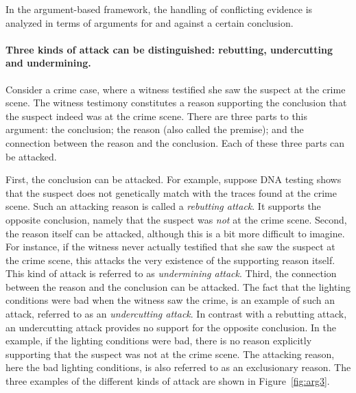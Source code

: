 \documentclass[10pt]{article}
\begin{document}
In the argument-based framework, the handling of conflicting evidence is analyzed 
in terms of arguments for and against a certain conclusion.


\paragraph{Three kinds of attack can be distinguished: rebutting, undercutting and undermining.}

Consider a crime case, where a witness testified she saw the suspect at the crime scene. The witness testimony constitutes a 
reason supporting the conclusion that the suspect indeed was at the crime scene. There are three parts to this argument: the conclusion; the reason (also called the premise); and the connection between the reason and the conclusion.
Each of these three parts can be attacked. %

First, the conclusion can be attacked. %
For example, suppose DNA testing shows that the suspect does not genetically match 
with the traces found at the crime scene. 
Such an attacking reason is called a \textit{rebutting attack}.  
It supports the opposite conclusion, namely that the suspect was \textit{not} 
at the crime scene. 
%
Second, the reason itself can be attacked, although this is a bit more difficult to imagine.  
 For instance, %
 if the witness never actually testified that she saw the suspect at the crime scene, this attacks the very 
 existence of the supporting reason itself. 
 This kind of attack is referred to as \textit{undermining attack}. 
%
Third, the connection between the reason and the conclusion can be attacked.
 The fact that the lighting conditions were bad when the witness saw the crime, 
 is an example of such an attack, referred to as an \textit{undercutting attack}.
 In contrast with a rebutting attack, an undercutting attack provides no support for the opposite conclusion. In the example, %
 if the lighting conditions were bad, there is no reason explicitly 
 supporting that the suspect was not at the crime scene. The attacking reason, %
 here the bad lighting conditions, is also referred to as an exclusionary reason. 
%
The three examples of the different kinds of attack are shown in Figure~\ref{fig:arg3}.
\end{document}
